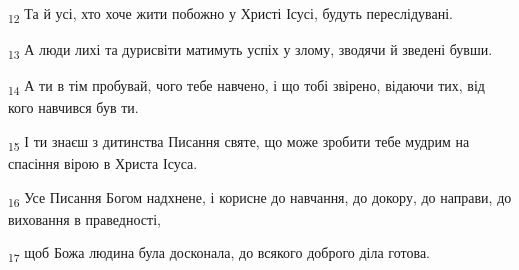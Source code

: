 \begin{tcolorbox}
\textsubscript{12} Та й усі, хто хоче жити побожно у Христі Ісусі, будуть переслідувані.
\end{tcolorbox}
\begin{tcolorbox}
\textsubscript{13} А люди лихі та дурисвіти матимуть успіх у злому, зводячи й зведені бувши.
\end{tcolorbox}
\begin{tcolorbox}
\textsubscript{14} А ти в тім пробувай, чого тебе навчено, і що тобі звірено, відаючи тих, від кого навчився був ти.
\end{tcolorbox}
\begin{tcolorbox}
\textsubscript{15} І ти знаєш з дитинства Писання святе, що може зробити тебе мудрим на спасіння вірою в Христа Ісуса.
\end{tcolorbox}
\begin{tcolorbox}
\textsubscript{16} Усе Писання Богом надхнене, і корисне до навчання, до докору, до направи, до виховання в праведності,
\end{tcolorbox}
\begin{tcolorbox}
\textsubscript{17} щоб Божа людина була досконала, до всякого доброго діла готова.
\end{tcolorbox}
